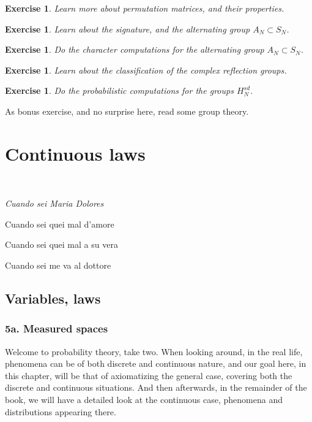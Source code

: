 \documentclass[12pt]{amsbook}
\newtheorem{exercise}[theorem]{Exercise}
\begin{document}
\begin{exercise}
Learn more about permutation matrices, and their properties.
\end{exercise}

\begin{exercise}
Learn about the signature, and the alternating group $A_N\subset S_N$.
\end{exercise}

\begin{exercise}
Do the character computations for the alternating group $A_N\subset S_N$.
\end{exercise}

\begin{exercise}
Learn about the classification of the complex reflection groups.
\end{exercise}

\begin{exercise}
Do the probabilistic computations for the groups $H_N^{sd}$.
\end{exercise}

As bonus exercise, and no surprise here, read some group theory.

\part{Continuous laws}

\ \vskip50mm

\begin{center}
{\em Cuando sei Maria Dolores

Cuando sei quei mal d'amore

Cuando sei quei mal a su vera

Cuando sei me va al dottore}
\end{center}

\chapter{Variables, laws}

\section*{5a. Measured spaces}

Welcome to probability theory, take two. When looking around, in the real life, phenomena can be of both discrete and continuous nature, and our goal here, in this chapter, will be that of axiomatizing the general case, covering both the discrete and continuous situations. And then afterwards, in the remainder of the book, we will have a detailed look at the continuous case, phenomena and distributions appearing there.
\end{document}
